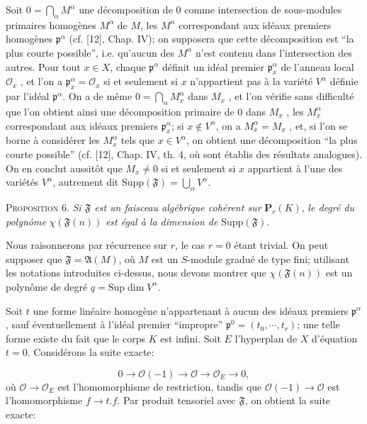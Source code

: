Soit $0 = \bigcap_\alpha M^\alpha$ une décomposition de 0 comme intersection de sous-modules primaires homogènes $M^\alpha$ de $M$, les $M^\alpha$ correspondant aux idéaux premiers homogènes $\mathfrak{p}^\alpha$ (cf. [12], Chap. IV); on supposera que cette décomposition est ``la plus courte possible'', i.e. qu'aucun des $M^\alpha$ n'est contenu dans l'intersection des autres. Pour tout $x \in X$, chaque $\mathfrak{p}^\alpha$ définit un idéal premier $\mathfrak{p}_x^\alpha$ de l'anneau local $\mathcal{O}_x$ , et l'on a $\mathfrak{p}_x^\alpha = \mathcal{O}_x$ si et seulement si $x$ n'appartient pas à la variété $V^\alpha$ définie par l'idéal $\mathfrak{p}^\alpha$. On a de même $0 = \bigcap_\alpha M_x^\alpha$ dans $M_x$ , et l'on vérifie sans difficulté que l'on obtient ainsi une décomposition primaire de 0 dans $M_x$ , les $M_x^\alpha$ correspondant aux idéaux premiers $\mathfrak{p}_x^\alpha$; si $x \notin V^\alpha$, on a $M_x^\alpha = M_x$ , et, si l'on se borne à considérer les $M_x^\alpha$ tels que $x \in V^\alpha$, on obtient une décomposition ``la plus courte possible'' (cf. [12], Chap. IV, th. 4, où sont établis des résultats analogues). On en conclut aussitôt que $M_x \neq 0$ si et seulement si $x$ appartient à l'une des variétés $V^\alpha$, autrement dit $\mathrm{Supp}(\mathfrak{F}) = \bigcup_\alpha V^\alpha$.

\textsc{Proposition} 6. \textit{Si $\mathfrak{F}$ est un faisceau algébrique cohérent sur} $\mathbf{P}_r(K)$, \textit{le degré du polynôme} $\chi(\mathfrak{F}(n))$ \textit{est égal à la dimension de} $\mathrm{Supp}(\mathfrak{F})$.

Nous raisonnerons par récurrence sur $r$, le cas $r = 0$ étant trivial. On peut supposer que $\mathfrak{F} = \mathfrak{A}(M)$, où $M$ est un $S$-module gradué de type fini; utilisant les notations introduites ci-dessus, nous devons montrer que $\chi(\mathfrak{F}(n))$ est un polynôme de degré $q = \mathrm{Sup} \dim V^\alpha$.



Soit $t$ une forme linéaire homogène n'appartenant à aucun des idéaux premiers $\mathfrak{p}^\alpha$, sauf éventuellement à l'idéal premier ``impropre'' $\mathfrak{p}^0 = (t_0 , \cdots , t_r)$; une telle forme existe du fait que le corps $K$ est infini. Soit $E$ l'hyperplan de $X$ d'équation $t = 0$. Considérons la suite exacte:

\begin{equation*}
0 \to \mathcal{O}(-1) \to \mathcal{O} \to \mathcal{O}_E \to 0,
\end{equation*}
où $\mathcal{O} \to \mathcal{O}_E$ est l'homomorphisme de restriction, tandis que $\mathcal{O}(-1) \to \mathcal{O}$ est l'homomorphisme $f \to t.f$. Par produit tensoriel avec $\mathfrak{F}$, on obtient la suite exacte:

